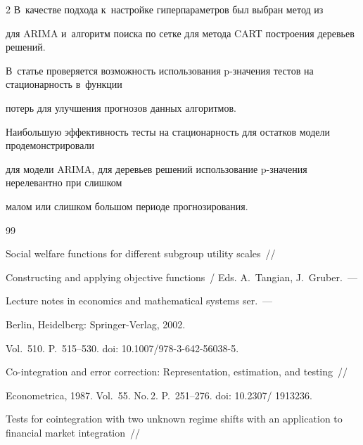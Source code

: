 \begin{multicols}{2}
В~качестве подхода к~настройке гиперпараметров был выбран метод из~\cite{17-kr} 

для ARIMA и~алгоритм поиска по сетке для метода CART построения деревьев решений. 

В~статье проверяется возможность использования p-зна\-че\-ния тестов на стационарность в~функции 

потерь для улучшения прогнозов данных алгоритмов.



Наибольшую эффективность тесты на стационарность для остатков модели продемонстрировали 

для модели ARIMA, для деревьев решений использование p-зна\-че\-ния нерелевантно при слишком 

малом или слишком большом периоде прогнозирования.



{\small\frenchspacing

 {%


 \begin{thebibliography}{99}





Social welfare functions for different subgroup utility scales~// 

Constructing and applying objective functions~/ Eds. A.~Tangian, J.~Gruber.~--- 

Lecture notes in economics and mathematical systems ser.~---

 Berlin, Heidelberg: Springer-Verlag, 2002. 

Vol.~510. P.~515--530.  doi: 10.1007/978-3-642-56038-5.







Co-integration and error correction: Representation, estimation, and testing~//  

Econometrica, 1987. Vol.~55. No.\,2. P.~251--276.  doi: 10.2307/ 1913236.







Tests for cointegration with two unknown regime shifts with an application to financial market integration~//  


\end{thebibliography}}}
\end{multicols}
